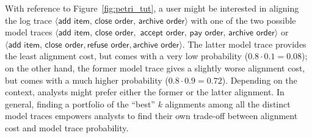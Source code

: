 With reference to Figure~\ref{fig:petri_tut}, a user might be interested in aligning the log trace $\langle \textsf{add item},\,\textsf{close order},\,\textsf{archive order}\rangle$ with one of the two possible model traces $\langle \textsf{add item},\,\textsf{close order},$ $\textsf{accept order},\,\textsf{pay order},\,\textsf{archive order}\rangle$ or $\langle\textsf{add item},\,\textsf{close order}, \textsf{refuse order}, \textsf{archive order}\rangle$. The latter model trace provides the least alignment cost, but comes with a very low probability ($0.8 \cdot 0.1 = 0.08$); on the other hand, the former model trace gives a slightly worse alignment cost, but comes with a much higher probability ($0.8 \cdot 0.9 = 0.72$). Depending on the context, analysts might prefer either the former or the latter alignment. In general, finding a portfolio of the ``best'' $k$ alignments among all the distinct model traces empowers analysts to find their own trade-off between alignment cost and model trace probability.

